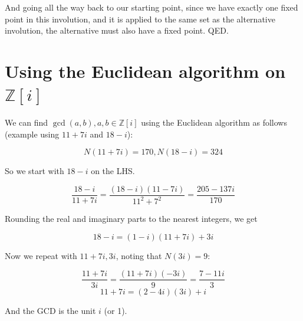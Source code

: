 \documentclass{article}
\begin{document}
And going all the way back to our starting point, since we have exactly one fixed point
in this involution, and it is applied to the same set as the alternative involution,
the alternative must also have a fixed point. QED.


\appendix

\section{Using the Euclidean algorithm on $\mathbb{Z}[i]$}

We can find $\gcd(a,b), a,b \in \mathbb{Z}[i]$ using the Euclidean algorithm
as follows (example using $11 + 7i$ and $18 - i$):

\[N(11+7i) = 170, N(18-i)=324 \]

So we start with $18-i$ on the LHS.

\[ \frac{18 - i}{11 + 7i} = \frac{(18 - i)(11 - 7i)}{11^2+7^2} = \frac{205 - 137i}{170} \]

Rounding the real and imaginary parts to the nearest integers, we get 

\[ 18 - i = (1 - i)(11 + 7i) + 3i \]

Now we repeat with $11 + 7i, 3i$, noting that $N(3i) = 9$:

\[ \frac{11+7i}{3i} = \frac{(11 + 7i)(-3i)}{9} = \frac{7 -11i}{3} \]
\[ 11 + 7i = (2 - 4i)(3i) +i \]

And the GCD is the unit $i$ (or 1).
\end{document}
